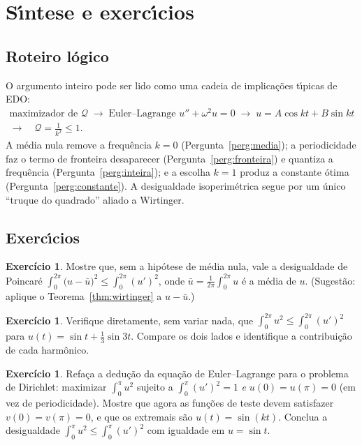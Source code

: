 \documentclass[11pt,a4paper]{amsart}
\newcommand{\Q}{\mathcal{Q}}
\theoremstyle{plain}
\theoremstyle{definition}
\newtheorem{exercicio}[teorema]{Exercício}
\theoremstyle{remark}
\begin{document}
\section{S\'\i ntese e exerc\'\i cios}

\subsection*{Roteiro l\'ogico}
O argumento inteiro pode ser lido como uma cadeia de implica\c{c}\~oes
t\'\i picas de EDO:
\[
  \begin{gathered}
  \text{maximizador de }\Q
  \;\longrightarrow\;
  \text{Euler--Lagrange } u''+\omega^2u=0
  \;\longrightarrow\;
  u = A\cos kt + B\sin kt \\[2pt]
  \longrightarrow\quad
  \Q=\tfrac{1}{k^2}\le 1 .
  \end{gathered}
\]
A m\'edia nula remove a frequ\^encia $k=0$
(Pergunta~\ref{perg:media}); a periodicidade faz o termo de fronteira
desaparecer (Pergunta~\ref{perg:fronteira}) e quantiza a frequ\^encia
(Pergunta~\ref{perg:inteira}); e a escolha $k=1$ produz a constante \'otima
(Pergunta~\ref{perg:constante}). A desigualdade isoperim\'etrica segue por um
\'unico ``truque do quadrado'' aliado a Wirtinger.

\subsection*{Exerc\'\i cios}

\begin{exercicio}
Mostre que, sem a hip\'otese de m\'edia nula, vale a desigualdade de
Poincar\'e $\int_0^{2\pi}\big(u-\bar u\big)^2\le \int_0^{2\pi}(u')^2$, onde
$\bar u=\frac{1}{2\pi}\int_0^{2\pi}u$ \'e a m\'edia de $u$. (Sugest\~ao:
aplique o Teorema~\ref{thm:wirtinger} a $u-\bar u$.)
\end{exercicio}

\begin{exercicio}
Verifique diretamente, sem variar nada, que $\int_0^{2\pi}u^2\le
\int_0^{2\pi}(u')^2$ para $u(t)=\sin t + \tfrac13\sin 3t$. Compare os dois
lados e identifique a contribui\c{c}\~ao de cada harm\^onico.
\end{exercicio}

\begin{exercicio}
Refa\c{c}a a dedu\c{c}\~ao da equa\c{c}\~ao de Euler--Lagrange para o problema
de Dirichlet: maximizar $\int_0^{\pi}u^2$ sujeito a $\int_0^{\pi}(u')^2=1$
\emph{e} $u(0)=u(\pi)=0$ (em vez de periodicidade). Mostre que agora as
fun\c{c}\~oes de teste devem satisfazer $v(0)=v(\pi)=0$, e que os extremais
s\~ao $u(t)=\sin(kt)$. Conclua a desigualdade $\int_0^\pi u^2\le\int_0^\pi
(u')^2$ com igualdade em $u=\sin t$.
\end{exercicio}
\end{document}
